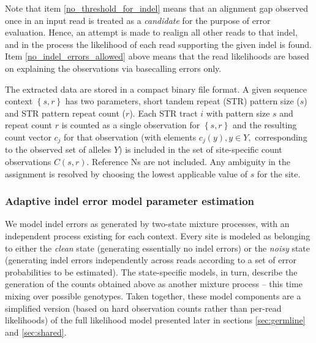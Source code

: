 \documentclass{article}
\begin{document}
Note that item \ref{no_threshold_for_indel} means that an alignment gap observed once in an input read is treated as a \emph{candidate} for the purpose of error evaluation. Hence, an attempt is made to realign all other reads to that indel, and in the process the likelihood of each read supporting the given indel is found.  Item \ref{no_indel_errors_allowed} above means that the read likelihoods are based on explaining the observations via basecalling errors only.

The extracted data are stored in a compact binary file format. A given sequence context $\left\{ s,r \right\}$ has two parameters, short tandem repeat (STR) pattern size ($s$) and STR pattern repeat count ($r$). Each STR tract $i$ with pattern size $s$ and repeat count $r$ is counted as a single observation for $\left\{ s,r \right\}$ and the resulting count vector $c_j$ for that observation (with elements $c_j(y), y \in Y,$ corresponding to the observed set of alleles $Y$) is included in the set of site-specific count observations $C(s,r)$. Reference Ns are not included. Any ambiguity in the assignment is resolved by choosing the lowest applicable value of $s$ for the site. 

\subsubsection{Adaptive indel error model parameter estimation}
We model indel errors as generated by two-state mixture processes, with an independent process existing for each context. Every site is modeled as belonging to either the \emph{clean} state (generating essentially no indel errors) or the \emph{noisy} state (generating indel errors independently across reads according to a set of error probabilities to be estimated). The state-specific models, in turn, describe the generation of the counts obtained above as another mixture process -- this time mixing over possible genotypes. Taken together, these model components are a simplified version (based on hard observation counts rather than per-read likelihoods) of the full likelihood model presented later in sections \ref{sec:germline} and \ref{sec:shared}.
\end{document}
